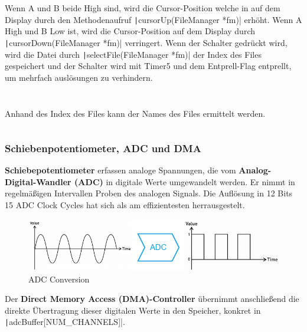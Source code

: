 Wenn A und B beide High sind, wird die Cursor-Position welche in auf dem Display durch den Methodenaufruf \texttt|cursorUp(FileManager *fm)|
erhöht. Wenn A High und B Low ist, wird die Cursor-Position auf dem Display durch \texttt|cursorDown(FileManager *fm)| verringert. Wenn der Schalter gedrückt wird, wird die Datei durch \texttt|selectFile(FileManager *fm)| der Index des Files gespeichert und der Schalter wird mit Timer5 und dem Entprell-Flag entprellt, um mehrfach auslösungen zu verhindern.
 
 \inputminted[firstline=68, lastline=74]{c}{../../f401_display_encoder_fader_test/Core/Src/filemanager.c}
 
  \inputminted[firstline=84, lastline=90]{c}{../../f401_display_encoder_fader_test/Core/Src/filemanager.c}
  
\newpage  
Anhand des Index des Files kann der Names des Files ermittelt werden.

	
\inputminted[firstline=159, lastline=161]{c}{../../f401_display_encoder_fader_test/Core/Src/filemanager.c}
  
 
\subsubsection{Schiebenpotentiometer, ADC und DMA}

\textbf{Schiebepotentiometer} erfassen analoge Spannungen, die vom \textbf{Analog-Digital-Wandler (ADC)} in digitale Werte umgewandelt werden. Er nimmt in regelmäßigen Intervallen Proben des analogen Signals. Die Auflösung in 12 Bits 15 ADC Clock Cycles hat sich als am effizientesten herrausgestelt.

\begin{figure}[H]
	\centering
	\includegraphics[width=1.0\textwidth]{images/08_durchfuehrung/interface/Conversion.drawio.png}
	\caption{ADC Conversion}
	\label{fig:conversion}
\end{figure}

Der \textbf{Direct Memory Access (DMA)-Controller} übernimmt anschließend die direkte Übertragung dieser digitalen Werte in den Speicher, konkret in  \texttt|adcBuffer[NUM_CHANNELS]|.

